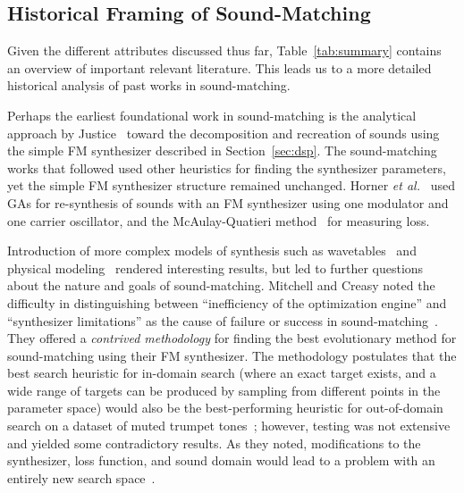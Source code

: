 \documentclass[lettersize,journal]{IEEEtran}
\begin{document}
\subsection{Historical Framing of Sound-Matching}
Given the different attributes discussed thus far, Table~\ref{tab:summary} contains an overview of important relevant literature. This leads us to a more detailed historical analysis of past works in sound-matching.

Perhaps the earliest foundational work in sound-matching is the analytical approach by Justice~\cite{justice1979analytic} toward the decomposition and recreation of sounds using the simple FM synthesizer described in Section~\ref{sec:dsp}. The sound-matching works that followed used other heuristics for finding the synthesizer parameters, yet the simple FM synthesizer structure remained unchanged. Horner \textit{et al.}~\cite{horner1993machine} used GAs for re-synthesis of sounds with an FM synthesizer using one modulator and one carrier oscillator, and the McAulay-Quatieri method~\cite{mcaulay1986speech} for measuring loss. 


Introduction of more complex models of synthesis such as wavetables~\cite{horner2003auto} and physical modeling~\cite{riionheimo2003parameter} rendered interesting results, but led to further questions about the nature and goals of sound-matching. Mitchell and Creasy noted the difficulty in distinguishing between ``inefficiency of the optimization engine'' and ``synthesizer limitations'' as the cause of failure or success in sound-matching~\cite{mitchell2007evolutionary}. They offered a \textit{contrived methodology} for finding the best evolutionary method for sound-matching using their FM synthesizer. The methodology postulates that the best search heuristic for in-domain search (where an exact target exists, and a wide range of targets can be produced by sampling from different points in the parameter space) would also be the best-performing heuristic for out-of-domain search on a dataset of muted trumpet tones~\cite{opolko1989mcgill}; however, testing was not extensive and yielded some contradictory results. As they noted, modifications to the synthesizer, loss function, and sound domain would lead to a problem with an entirely new search space~\cite{mitchell2007evolutionary}. 
\end{document}
